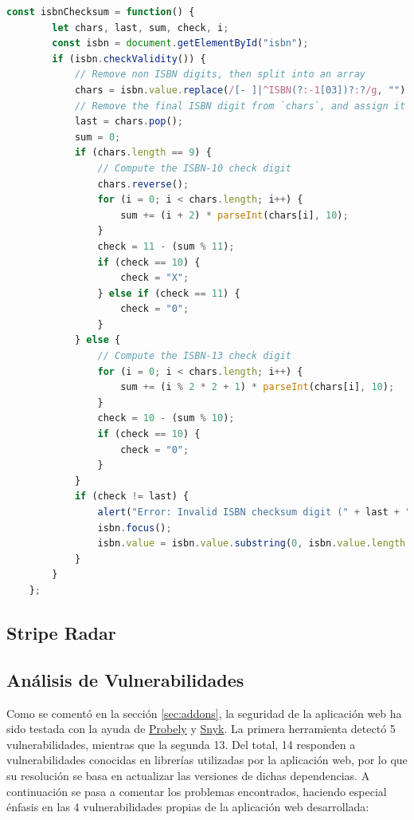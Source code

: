 \documentclass[a4paper]{article}
\begin{document}
	\begin{lstlisting}[language=JavaScript,caption=Validación del dígito de control del ISBN en cliente,label=list:js_isbn]
	const isbnChecksum = function() {
		let chars, last, sum, check, i;
		const isbn = document.getElementById("isbn");
		if (isbn.checkValidity()) {
			// Remove non ISBN digits, then split into an array
			chars = isbn.value.replace(/[- ]|^ISBN(?:-1[03])?:?/g, "").split("");
			// Remove the final ISBN digit from `chars`, and assign it to `last`
			last = chars.pop();
			sum = 0;
			if (chars.length == 9) {
				// Compute the ISBN-10 check digit
				chars.reverse();
				for (i = 0; i < chars.length; i++) {
					sum += (i + 2) * parseInt(chars[i], 10);
				}
				check = 11 - (sum % 11);
				if (check == 10) {
					check = "X";
				} else if (check == 11) {
					check = "0";
				}
			} else {
				// Compute the ISBN-13 check digit
				for (i = 0; i < chars.length; i++) {
					sum += (i % 2 * 2 + 1) * parseInt(chars[i], 10);
				}
				check = 10 - (sum % 10);
				if (check == 10) {
					check = "0";
				}
			}
			if (check != last) {
				alert("Error: Invalid ISBN checksum digit (" + last + "). Try with (" + check + ")");
				isbn.focus();
				isbn.value = isbn.value.substring(0, isbn.value.length - 1);
			}
		}
	};
	\end{lstlisting}
	
	\subsection{Stripe Radar} \label{sec:striperadar}
	\subsection{Análisis de Vulnerabilidades} \label{sec:vulnerabilities}
	Como se comentó en la sección \ref{sec:addons}, la seguridad de la aplicación web ha sido testada con la ayuda de \href{https://probely.com/}{Probely} y \href{https://snyk.io/}{Snyk}. La primera herramienta detectó 5 vulnerabilidades, mientras que la segunda 13. Del total, 14 responden a vulnerabilidades conocidas en librerías utilizadas por la aplicación web, por lo que su resolución se basa en actualizar las versiones de dichas dependencias. A continuación se pasa a comentar los problemas encontrados, haciendo especial énfasis en las 4 vulnerabilidades propias de la aplicación web desarrollada: 
	
\end{document}
